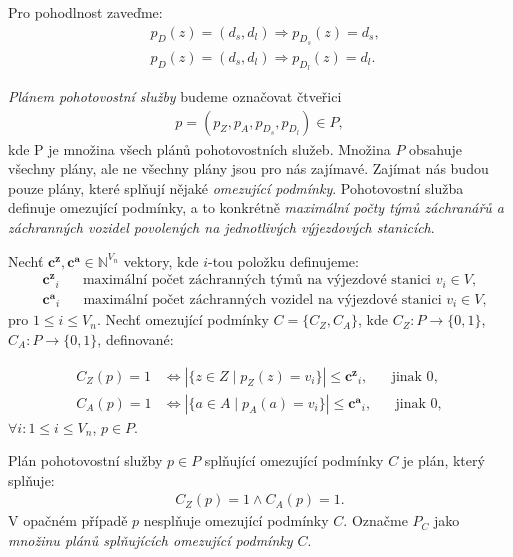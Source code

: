 Pro pohodlnost zaveďme:
\begin{align*}
  & p_D(z) = (d_s, d_l) \Rightarrow p_{D_s}(z) = d_s, \\
  & p_D(z) = (d_s, d_l) \Rightarrow p_{D_l}(z) = d_l.
\end{align*}

\textit{Plánem pohotovostní služby} budeme označovat 
čtveřici
\begin{align*}
  p = (p_Z, p_A, p_{D_{s}}, p_{D_{l}}) \in P,
\end{align*}
kde P je množina všech plánů pohotovostních služeb.
Množina $P$ obsahuje všechny plány, ale ne všechny plány jsou pro nás zajímavé.
Zajímat nás budou pouze plány, které splňují nějaké \textit{omezující podmínky}.
Pohotovostní služba definuje omezující podmínky, a to konkrétně \textit{maximální počty týmů záchranářů a záchranných vozidel povolených na jednotlivých výjezdových stanicích}.

\clearpage

\begin{definice}
  Nechť $\mathbf{c^z}, \mathbf{c^a} \in \mathbb{N}^{V_n}$ vektory, 
  kde $i$-tou položku definujeme:
  \begin{align*}
    &\mathbf{c^z}_i \hspace{20pt} \text{maximální počet záchranných týmů na výjezdové stanici $v_i \in V$}, \\ 
    &\mathbf{c^a}_i \hspace{20pt} \text{maximální počet záchranných vozidel na výjezdové stanici $v_i \in V$},
  \end{align*}
  pro $1 \leq i \leq V_n$.
  Nechť omezující podmínky $C = \{ C_Z, C_A \}$, kde $C_Z \colon P \rightarrow \{ 0, 1 \}$, $C_A \colon P \rightarrow \{ 0, 1 \}$, definované:

  \begin{align*}
    C_Z(p) = 1 &\iff |\{ z \in Z \mid p_Z(z) = v_i \}| \leq \mathbf{c^z}_i, \hspace{20pt} \text{jinak 0}, \\
    C_A(p) = 1 &\iff |\{ a \in A \mid p_A(a) = v_i \}| \leq \mathbf{c^a}_i, \hspace{20pt} \text{jinak 0},
  \end{align*}
  $\forall i \colon 1 \leq i \leq V_n$, $p \in P$.
\end{definice}

Plán pohotovostní služby $p \in P$ splňující omezující podmínky $C$ je plán, který splňuje:
\begin{align*}
    C_Z(p) = 1 \land C_A(p) = 1.
\end{align*}
V opačném případě $p$ nesplňuje omezující podmínky $C$.
Označme $P_C$ jako \textit{množinu plánů splňujících omezující podmínky $C$}.

